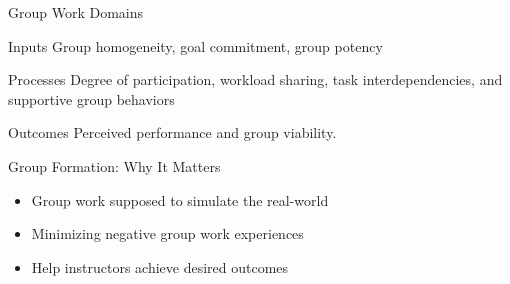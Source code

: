 \documentclass[12pt,table]{beamer}
\begin{document}
\begin{frame}{Group Work Domains \cite{chapman2006}}
    \begin{alertblock}{Inputs}
    Group homogeneity, goal commitment, group potency
    \end{alertblock}
    \begin{alertblock}{Processes} Degree of participation, workload sharing, task interdependencies, and supportive group behaviors
    \end{alertblock}
    \begin{alertblock}{Outcomes} Perceived performance and group viability.
\end{alertblock}
\end{frame}

\begin{frame}{Group Formation: Why It Matters \cite{potosky2014}}

    \begin{itemize}
        \item Group work supposed to simulate the real-world
        \item Minimizing negative group work experiences
        \item Help instructors achieve desired outcomes
\end{itemize}
\end{frame}
\end{document}
